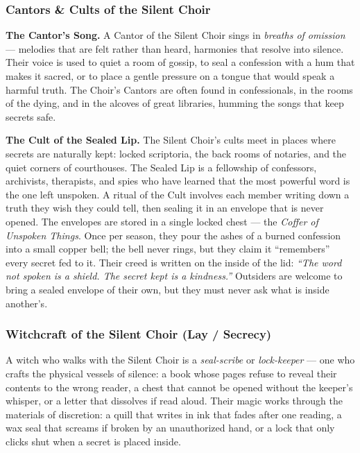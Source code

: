 \subsubsection*{Cantors \& Cults of the Silent Choir}

\textbf{The Cantor's Song.} A Cantor of the Silent Choir sings in \textit{breaths of omission} --- melodies that are felt rather than heard, harmonies that resolve into silence. Their voice is used to quiet a room of gossip, to seal a confession with a hum that makes it sacred, or to place a gentle pressure on a tongue that would speak a harmful truth. The Choir's Cantors are often found in confessionals, in the rooms of the dying, and in the alcoves of great libraries, humming the songs that keep secrets safe.

\textbf{The Cult of the Sealed Lip.} The Silent Choir's cults meet in places where secrets are naturally kept: locked scriptoria, the back rooms of notaries, and the quiet corners of courthouses. The Sealed Lip is a fellowship of confessors, archivists, therapists, and spies who have learned that the most powerful word is the one left unspoken. A ritual of the Cult involves each member writing down a truth they wish they could tell, then sealing it in an envelope that is never opened. The envelopes are stored in a single locked chest --- the \textit{Coffer of Unspoken Things}. Once per season, they pour the ashes of a burned confession into a small copper bell; the bell never rings, but they claim it ``remembers'' every secret fed to it. Their creed is written on the inside of the lid: \textit{``The word not spoken is a shield. The secret kept is a kindness.''} Outsiders are welcome to bring a sealed envelope of their own, but they must never ask what is inside another's.

\subsubsection*{Witchcraft of the Silent Choir (Lay / Secrecy)}

A witch who walks with the Silent Choir is a \textit{seal-scribe} or \textit{lock-keeper} --- one who crafts the physical vessels of silence: a book whose pages refuse to reveal their contents to the wrong reader, a chest that cannot be opened without the keeper's whisper, or a letter that dissolves if read aloud. Their magic works through the materials of discretion: a quill that writes in ink that fades after one reading, a wax seal that screams if broken by an unauthorized hand, or a lock that only clicks shut when a secret is placed inside.


